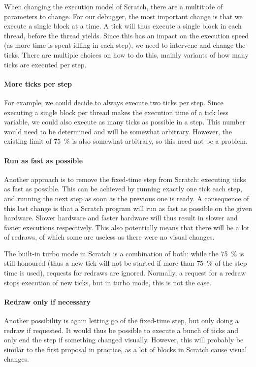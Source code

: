 \documentclass[../main]{subfiles}
\begin{document}
When changing the execution model of Scratch, there are a multitude of parameters to change.
For our debugger, the most important change is that we execute a single block at a time.
A tick will thus execute a single block in each thread, before the thread yields.
Since this has an impact on the execution speed (as more time is spent idling in each step), we need to intervene and change the ticks.
There are multiple choices on how to do this, mainly variants of how many ticks are executed per step.

\paragraph{More ticks per step}
For example, we could decide to always execute two ticks per step.
Since executing a single block per thread makes the execution time of a tick less variable, we could also execute as many ticks as possible in a step.
This number would need to be determined and will be somewhat arbitrary.
However, the existing limit of \qty{75}{\percent} is also somewhat arbitrary, so this need not be a problem.

\paragraph{Run as fast as possible}
Another approach is to remove the fixed-time step from Scratch: executing ticks as fast as possible.
This can be achieved by running exactly one tick each step, and running the next step as soon as the previous one is ready.
A consequence of this last change is that a Scratch program will run as fast as possible on the given hardware.
Slower hardware and faster hardware will thus result in slower and faster executions respectively.
This also potentially means that there will be a lot of redraws, of which some are useless as there were no visual changes.

The built-in turbo mode in Scratch is a combination of both: while the \qty{75}{\percent} is still honoured (thus a new tick will not be started if more than \qty{75}{\percent} of the step time is used), requests for redraws are ignored.
Normally, a request for a redraw stops execution of new ticks, but in turbo mode, this is not the case.

\paragraph{Redraw only if necessary}
Another possibility is again letting go of the fixed-time step, but only doing a redraw if requested.
It would thus be possible to execute a bunch of ticks and only end the step if something changed visually.
However, this will probably be similar to the first proposal in practice, as a lot of blocks in Scratch cause visual changes.
\end{document}

